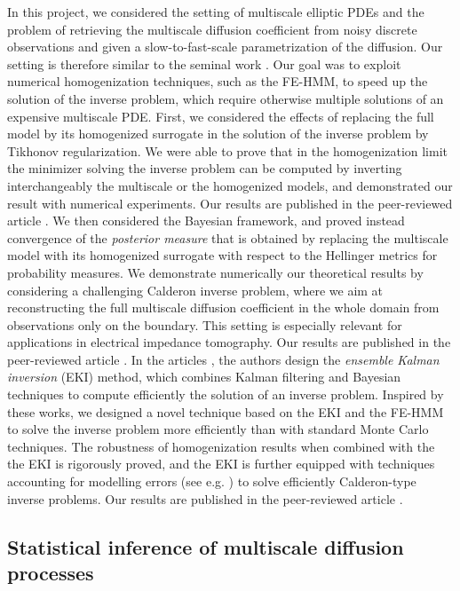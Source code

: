 \documentclass[10pt]{article}
\begin{document}
In this project, we considered the setting of multiscale elliptic PDEs and the problem of retrieving the multiscale diffusion coefficient from noisy discrete observations and given a slow-to-fast-scale parametrization of the diffusion. Our setting is therefore similar to the seminal work \cite{NPS12}. Our goal was to exploit numerical homogenization techniques, such as the FE-HMM, to speed up the solution of the inverse problem, which require otherwise multiple solutions of an expensive multiscale PDE. First, we considered the effects of replacing the full model by its homogenized surrogate in the solution of the inverse problem by Tikhonov regularization. We were able to prove that in the homogenization limit the minimizer solving the inverse problem can be computed by inverting interchangeably the multiscale or the homogenized models, and demonstrated our result with numerical experiments. Our results are published in the peer-reviewed article \cite{AbD19}. We then considered the Bayesian framework, and proved instead convergence of the \textit{posterior measure} that is obtained by replacing the multiscale model with its homogenized surrogate with respect to the Hellinger metrics for probability measures. We demonstrate numerically our theoretical results by considering a challenging Calderon inverse problem, where we aim at reconstructing the full multiscale diffusion coefficient in the whole domain from observations only on the boundary. This setting is especially relevant for applications in electrical impedance tomography. Our results are published in the peer-reviewed article \cite{AbD20}. In the articles \cite{ILS13,ScS17}, the authors design the \textit{ensemble Kalman inversion} (EKI) method, which combines Kalman filtering and Bayesian techniques to compute efficiently the solution of an inverse problem. Inspired by these works, we designed a novel technique based on the EKI and the FE-HMM to solve the inverse problem more efficiently than with standard Monte Carlo techniques. The robustness of homogenization results when combined with the the EKI is rigorously proved, and the EKI is further equipped with techniques accounting for modelling errors (see e.g. \cite{CES14,CDS18}) to solve efficiently Calderon-type inverse problems. Our results are published in the peer-reviewed article \cite{AGZ20}.
 
\subsection{Statistical inference of multiscale diffusion processes}\label{sec:AndreaZ}
\end{document}
